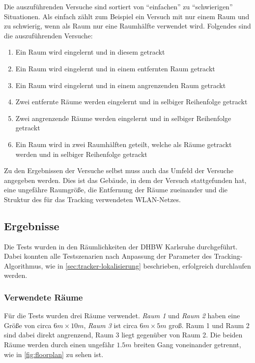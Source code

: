Die auszuführenden Versuche sind sortiert von \enquote{einfachen} zu \enquote{schwierigen} Situationen.
Als einfach zählt zum Beispiel ein Versuch mit nur einem Raum und zu schwierig, wenn als Raum nur eine
Raumhälfte verwendet wird.
Folgendes sind die auszuführenden Versuche:
\begin{enumerate}[label=\textbf{TS-\arabic*}]
	\item \label{ts:gleicher-raum} Ein Raum wird eingelernt und in diesem getrackt
	\item \label{ts:entfernter-raum} Ein Raum wird eingelernt und in einem entfernten Raum getrackt
	\item \label{ts:angrenzender-raum} Ein Raum wird eingelernt und in einem angrenzenden Raum getrackt
	\item \label{ts:zwei-nacheinander} Zwei entfernte Räume werden eingelernt und in selbiger Reihenfolge getrackt
	\item \label{ts:zwei-angrenzende-nacheinander} Zwei angrenzende Räume werden eingelernt und in selbiger Reihenfolge getrackt
	\item \label{ts:raumhälften} Ein Raum wird in zwei Raumhälften geteilt, welche als Räume getrackt werden und in selbiger Reihenfolge getrackt
\end{enumerate}

Zu den Ergebnissen der Versuche selbst muss auch das Umfeld der Versuche angegeben werden.
Dies ist das Gebäude, in dem der Versuch stattgefunden hat, eine ungefähre Raumgröße, die Entfernung der Räume zueinander
und die Struktur des für das Tracking verwendeten \gls{WLAN}-Netzes.

\subsection{Ergebnisse}

Die Tests wurden in den Räumlichkeiten der \gls{DHBW} Karlsruhe durchgeführt.
Dabei konnten alle Testszenarien nach Anpassung der Parameter des Tracking-Algorithmus, wie
in \autoref{sec:tracker-lokalisierung} beschrieben, erfolgreich durchlaufen werden.

\subsubsection{Verwendete Räume}

Für die Tests wurden drei Räume verwendet. \emph{Raum 1} und \emph{Raum 2} haben eine Größe von
circa $6m\times10m$, \emph{Raum 3} ist circa $6m\times5m$ groß. Raum 1 und Raum 2 sind dabei direkt
angrenzend, Raum 3 liegt gegenüber von Raum 2. Die beiden Räume werden durch einen ungefähr $1.5m$
breiten Gang voneinander getrennt, wie in \autoref{fig:floorplan} zu sehen ist.


